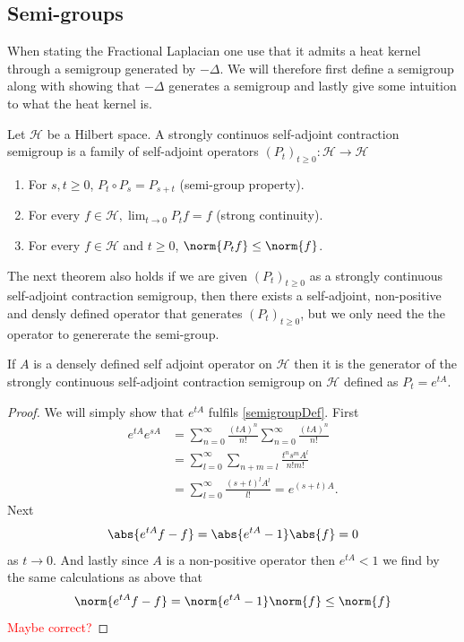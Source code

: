 \subsection{Semi-groups}
When stating the Fractional Laplacian one use that it admits a heat kernel through a semigroup generated by $-\Delta$. We will therefore first define a semigroup along with showing that $-\Delta$ generates a semigroup and lastly give some intuition to what the heat kernel is.

\begin{defi}\label{semigroupDef}
	Let $\mathcal{H}$ be a Hilbert space. A strongly continuos self-adjoint contraction semigroup is a family of self-adjoint operators $(P_t)_{t \geq 0}: \mathcal{H} \to \mathcal{H}$
	\begin{enumerate}
		\item For $s,t \geq 0$, $P_t \circ P_s = P_{s +t}$ (semi-group property).
		\item For every $f \in \mathcal{H}, \lim_{t \to 0} P_t f= f$ (strong continuity).
		\item For every $f \in \mathcal{H}$ and $t \geq 0$, $\norm{P_t f} \leq \norm{f}$.
	\end{enumerate}
\end{defi}

The next theorem also holds if we are given $(P_t)_{t \geq 0}$ as a strongly continuous self-adjoint contraction semigroup, then there exists a self-adjoint, non-positive and densly defined operator that generates $(P_t)_{t \geq 0}$, but we only need the the operator to genererate the semi-group.
\begin{theorem}\label{genSemigroup}
	If $A$ is a densely defined self adjoint operator on $\mathcal{H}$ then it is the generator of the strongly continuous self-adjoint contraction semigroup on $\mathcal{H}$ defined as $P_t = e^{tA}$.
\end{theorem}
\begin{proof}
	We will simply show that $e^{tA}$ fulfils \cref{semigroupDef}. First
	\begin{align}
		e^{t A}e^{sA} &= \sum_{n= 0}^{\infty} \frac{(tA)^{n}}{n!}\sum_{n= 0}^{\infty} \frac{(tA)^{n}}{n!} \\
		& = \sum_{l= 0}^{\infty} \sum_{n +m = l}\frac{t^ns^m A^{l}}{n!m!} \\
		&= \sum_{l= 0}^{\infty} \frac{(s+t)^{l}A^{l}}{l!} = e^{(s+t)A}.
	\end{align}
	Next
	\begin{align}
		\abs{e^{tA}f - f} = \abs{e^{tA} -1}\abs{f} = 0
	\end{align}
	as $t \to 0$. And lastly since $A$ is a non-positive operator then $e^{tA} < 1$ we find by the same calculations as above that
	$$\norm{e^{tA}f - f} = \norm{e^{tA} -1}\norm{f} \leq \norm{f}$$
	\textcolor{red}{Maybe correct?}
\end{proof}

